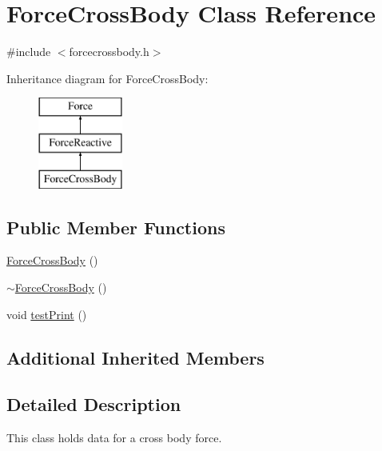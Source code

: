\hypertarget{class_force_cross_body}{\section{Force\-Cross\-Body Class Reference}
\label{class_force_cross_body}
}


{\ttfamily \#include $<$forcecrossbody.\-h$>$}

Inheritance diagram for Force\-Cross\-Body\-:\begin{figure}[H]
\begin{center}
\leavevmode
\includegraphics[height=3.000000cm]{class_force_cross_body}
\end{center}
\end{figure}
\subsection*{Public Member Functions}
\begin{DoxyCompactItemize}
\item 
\hyperlink{class_force_cross_body_a722c4ffad05245be224190bde22c6607}{Force\-Cross\-Body} ()
\item 
\hyperlink{class_force_cross_body_aaac5e33c56dcd4aee27f1e5ce1a0afa5}{$\sim$\-Force\-Cross\-Body} ()
\item 
void \hyperlink{class_force_cross_body_ab6bb83f04e9eec3b537b2570d712b3f8}{test\-Print} ()
\end{DoxyCompactItemize}
\subsection*{Additional Inherited Members}


\subsection{Detailed Description}
This class holds data for a cross body force. 

